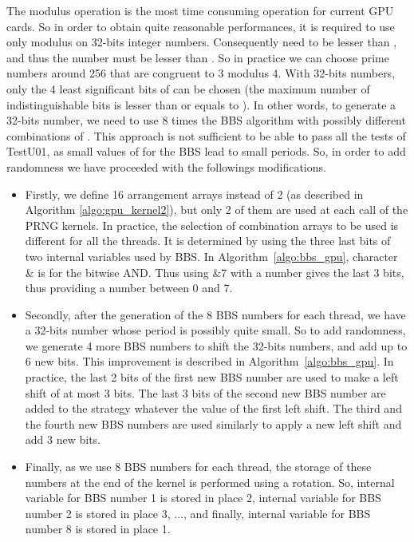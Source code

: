 \documentclass{article}
\begin{document}
  
The modulus operation is the most time consuming operation for current
GPU cards.  So in order to obtain quite reasonable performances, it is
required to use only modulus  on 32-bits integer numbers. Consequently
 need  to be lesser than ,  and thus the number  must be
lesser than .  So in practice we can choose prime numbers around
256 that are congruent to 3 modulus 4.  With 32-bits numbers, only the
4 least significant bits of  can be chosen (the maximum number of
indistinguishable    bits    is    lesser    than   or    equals    to
). In other words, to generate a  32-bits number, we need to use
8 times  the BBS  algorithm with possibly different  combinations of  . This
approach is  not sufficient to be able to pass  all the tests of TestU01,
as small values of   for the BBS  lead to
  small periods. So, in  order to add randomness  we have proceeded with
the followings  modifications. 
\begin{itemize}
\item
Firstly, we  define 16 arrangement arrays  instead of 2  (as described in
Algorithm \ref{algo:gpu_kernel2}), but only 2 of them are used at each call of
the  PRNG kernels. In  practice, the  selection of   combination
arrays to be used is different for all the threads. It is determined
by using  the three last bits  of two internal variables  used by BBS.
In Algorithm~\ref{algo:bbs_gpu},
character  \& is for the  bitwise AND. Thus using  \&7 with  a number
gives the last 3 bits, thus providing a number between 0 and 7.
\item
Secondly, after the  generation of the 8 BBS numbers  for each thread, we
have a 32-bits number whose period is possibly quite small. So
to add randomness,  we generate 4 more BBS numbers   to
shift  the 32-bits  numbers, and  add up to  6 new  bits.  This  improvement is
described  in Algorithm~\ref{algo:bbs_gpu}.  In  practice, the last 2 bits
of the first new BBS number are  used to make a left shift of at most
3 bits. The  last 3 bits of the  second new BBS number are  added to the
strategy whatever the value of the first left shift. The third and the
fourth new BBS  numbers are used similarly to apply  a new left shift
and add 3 new bits.
\item
Finally, as  we use 8 BBS numbers  for each thread, the  storage of these
numbers at the end of the  kernel is performed using a rotation. So,
internal  variable for  BBS number  1 is  stored in  place  2, internal
variable  for BBS  number 2  is  stored in  place 3,  ..., and finally, internal
variable for BBS number 8 is stored in place 1.
\end{itemize}
\end{document}
